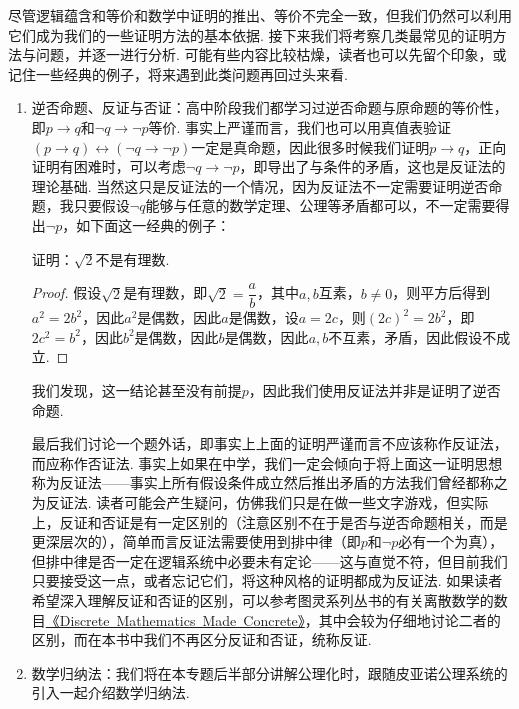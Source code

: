 尽管逻辑蕴含和等价和数学中证明的推出、等价不完全一致，但我们仍然可以利用它们成为我们的一些证明方法的基本依据. 接下来我们将考察几类最常见的证明方法与问题，并逐一进行分析. 可能有些内容比较枯燥，读者也可以先留个印象，或记住一些经典的例子，将来遇到此类问题再回过头来看.

\begin{enumerate}
    \item 逆否命题、反证与否证：高中阶段我们都学习过逆否命题与原命题的等价性，即$p\to q$和$\lnot q\to\lnot p$等价. 事实上严谨而言，我们也可以用真值表验证$(p\to q)\leftrightarrow(\lnot q\to\lnot p)$一定是真命题，因此很多时候我们证明$p\to q$，正向证明有困难时，可以考虑$\lnot q\to\lnot p$，即导出了与条件的矛盾，这也是反证法的理论基础. 当然这只是反证法的一个情况，因为反证法不一定需要证明逆否命题，我只要假设$\lnot q$能够与任意的数学定理、公理等矛盾都可以，不一定需要得出$\lnot p$，如下面这一经典的例子：

          \begin{example}
              证明：$\sqrt{2}$不是有理数.
          \end{example}
          \begin{proof}
              假设$\sqrt{2}$是有理数，即$\sqrt{2}=\dfrac{a}{b}$，其中$a,b$互素，$b\neq 0$，则平方后得到$a^2=2b^2$，因此$a^2$是偶数，因此$a$是偶数，设$a=2c$，则$(2c)^2=2b^2$，即$2c^2=b^2$，因此$b^2$是偶数，因此$b$是偶数，因此$a,b$不互素，矛盾，因此假设不成立.
          \end{proof}

          我们发现，这一结论甚至没有前提$p$，因此我们使用反证法并非是证明了逆否命题.

          最后我们讨论一个题外话，即事实上上面的证明严谨而言不应该称作反证法，而应称作否证法. 事实上如果在中学，我们一定会倾向于将上面这一证明思想称为反证法——事实上所有假设条件成立然后推出矛盾的方法我们曾经都称之为反证法. 读者可能会产生疑问，仿佛我们只是在做一些文字游戏，但实际上，反证和否证是有一定区别的（注意区别不在于是否与逆否命题相关，而是更深层次的），简单而言反证法需要使用到排中律（即$p$和$\lnot p$必有一个为真），但排中律是否一定在逻辑系统中必要未有定论——这与直觉不符，但目前我们只要接受这一点，或者忘记它们，将这种风格的证明都成为反证法. 如果读者希望深入理解反证和否证的区别，可以参考图灵系列丛书的有关离散数学的数目\href{https://github.com/FrightenedFoxCN/Discrete-Mathematics-Made-Concrete}{《Discrete\ Mathematics\ Made\ Concrete》}，其中会较为仔细地讨论二者的区别，而在本书中我们不再区分反证和否证，统称反证.

    \item 数学归纳法：我们将在本专题后半部分讲解公理化时，跟随皮亚诺公理系统的引入一起介绍数学归纳法.


\end{enumerate}
